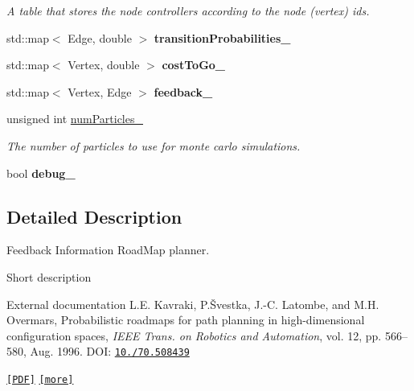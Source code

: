 \begin{DoxyCompactItemize}
\begin{DoxyCompactList}\small\item\em \-A table that stores the node controllers according to the node (vertex) ids. \end{DoxyCompactList}\item 
\hypertarget{class_f_i_r_m_ae206a19c2bc7d2a8a31b9ae6a1f40fda}{std\-::map$<$ \-Edge, double $>$ {\bfseries transition\-Probabilities\-\_\-}}\label{class_f_i_r_m_ae206a19c2bc7d2a8a31b9ae6a1f40fda}

\item 
\hypertarget{class_f_i_r_m_a2da49edf6ea58f4116cd3c31022bd693}{std\-::map$<$ \-Vertex, double $>$ {\bfseries cost\-To\-Go\-\_\-}}\label{class_f_i_r_m_a2da49edf6ea58f4116cd3c31022bd693}

\item 
\hypertarget{class_f_i_r_m_aae9e2e83177ef121adc36ef7f9e5d16d}{std\-::map$<$ \-Vertex, \-Edge $>$ {\bfseries feedback\-\_\-}}\label{class_f_i_r_m_aae9e2e83177ef121adc36ef7f9e5d16d}

\item 
\hypertarget{class_f_i_r_m_a17cff52eb2c31715ab8341b9daea1a3f}{unsigned int \hyperlink{class_f_i_r_m_a17cff52eb2c31715ab8341b9daea1a3f}{num\-Particles\-\_\-}}\label{class_f_i_r_m_a17cff52eb2c31715ab8341b9daea1a3f}

\begin{DoxyCompactList}\small\item\em \-The number of particles to use for monte carlo simulations. \end{DoxyCompactList}\item 
\hypertarget{class_f_i_r_m_a7fc88496b950b90b92876dea03b3102f}{bool {\bfseries debug\-\_\-}}\label{class_f_i_r_m_a7fc88496b950b90b92876dea03b3102f}

\end{DoxyCompactItemize}


\subsection{\-Detailed \-Description}
\-Feedback \-Information \-Road\-Map planner. 

\label{class_f_i_r_m_FIRM}%
\hypertarget{class_f_i_r_m_FIRM}{}%
 \begin{DoxyParagraph}{\-Short description}

\end{DoxyParagraph}
\begin{DoxyParagraph}{\-External documentation}
\-L.\-E. \-Kavraki, \-P.\-Švestka, \-J.-\/\-C. \-Latombe, and \-M.\-H. \-Overmars, \-Probabilistic roadmaps for path planning in high-\/dimensional configuration spaces, {\itshape \-I\-E\-E\-E \-Trans. on \-Robotics and \-Automation\/}, vol. 12, pp. 566–580, \-Aug. 1996. \-D\-O\-I\-: \href{http://dx.doi.org/10.1109/70.508439}{\tt 10./70.508439}\par
 \href{http://ieeexplore.ieee.org/ielx4/70/11078/00508439.pdf?tp=&arnumber=508439&isnumber=11078}{\tt \mbox{[}\-P\-D\-F\mbox{]}} \href{http://www.kavrakilab.org/robotics/prm.html}{\tt \mbox{[}more\mbox{]}} 
\end{DoxyParagraph}


